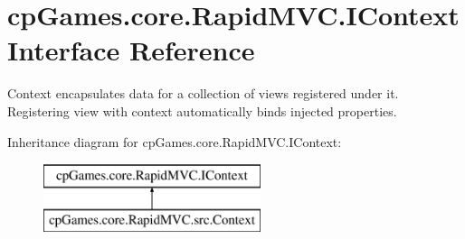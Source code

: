 \hypertarget{interfacecp_games_1_1core_1_1_rapid_m_v_c_1_1_i_context}{}\section{cp\+Games.\+core.\+Rapid\+M\+V\+C.\+I\+Context Interface Reference}
\label{interfacecp_games_1_1core_1_1_rapid_m_v_c_1_1_i_context}


Context encapsulates data for a collection of views registered under it. Registering view with context automatically binds injected properties.  


Inheritance diagram for cp\+Games.\+core.\+Rapid\+M\+V\+C.\+I\+Context\+:\begin{figure}[H]
\begin{center}
\leavevmode
\includegraphics[height=2.000000cm]{interfacecp_games_1_1core_1_1_rapid_m_v_c_1_1_i_context}
\end{center}
\end{figure}
